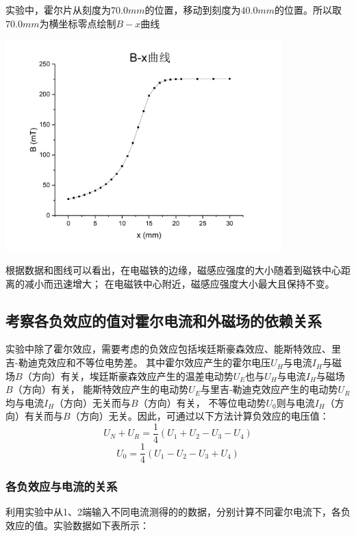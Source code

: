 \documentclass{article}
\begin{document}
    实验中，霍尔片从刻度为$70.0mm$的位置，移动到刻度为$40.0mm$的位置。所以取$70.0mm$为横坐标零点绘制$B-x$曲线
    
    \begin{center}
        \includegraphics[width=0.8\textwidth]{B-x curve.jpg}
    \end{center}

    根据数据和图线可以看出，在电磁铁的边缘，磁感应强度的大小随着到磁铁中心距离的减小而迅速增大；
    在电磁铁中心附近，磁感应强度大小最大且保持不变。

    \subsection{考察各负效应的值对霍尔电流和外磁场的依赖关系}
    实验中除了霍尔效应，需要考虑的负效应包括埃廷斯豪森效应、能斯特效应、里吉-勒迪克效应和不等位电势差。
    其中霍尔效应产生的霍尔电压$U_H$与电流$I_H$与磁场$B$（方向）有关，埃廷斯豪森效应产生的温差电动势$U_E$也与$U_H$与电流$I_H$与磁场$B$（方向）有关，
    能斯特效应产生的电动势$U_E$与里吉-勒迪克效应产生的电动势$U_R$均与电流$I_H$（方向）无关而与$B$（方向）有关，
    不等位电动势$U_0$则与电流$I_H$（方向）有关而与$B$（方向）无关。因此，可通过以下方法计算负效应的电压值：
    $$U_N+U_R=\frac{1}{4}(U_1+U_2-U_3-U_4)$$
    $$U_0=\frac{1}{4}(U_1-U_2-U_3+U_4)$$
    \subsubsection{各负效应与电流的关系}
    利用实验中从1、2端输入不同电流测得的的数据，分别计算不同霍尔电流下，各负效应的值。实验数据如下表所示：
\end{document}
